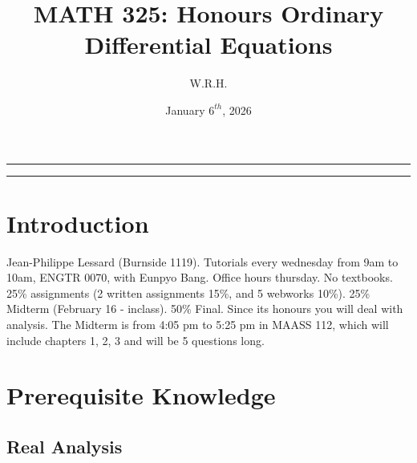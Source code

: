\documentclass{article}
\begin{document}
\title{MATH 325: Honours Ordinary Differential Equations}
\author{W.R.H.}
\date{January \(6^{th}\), 2026}
\setcounter{Maxaffil}{0}
\renewcommand\Affilfont{\itshape\small}
\maketitle

\noindent\rule{\textwidth}{0.4pt}
\thispagestyle{empty}
\begin{abstract}

\end{abstract}
\noindent\rule{\textwidth}{0.4pt}
\clearpage

\thispagestyle{empty}
{
  \hypersetup{linkcolor=black}
  \tableofcontents
}
\clearpage

\setcounter{page}{1}
\section{Introduction}
Jean-Philippe Lessard (Burnside 1119).
Tutorials every wednesday from 9am to 10am, ENGTR 0070, with Eunpyo Bang.
Office hours thursday.
No textbooks.
25\% assignments (2 written assignments 15\%, and 5 webworks 10\%).
25\% Midterm (February 16 - inclass).
50\% Final.
Since its honours you will deal with analysis. The Midterm is from 4:05 pm to 5:25 pm in MAASS 112, which will include chapters 1, 2, 3 and will be 5 questions long.

\section{Prerequisite Knowledge}
\subsection{Real Analysis}
\end{document}
